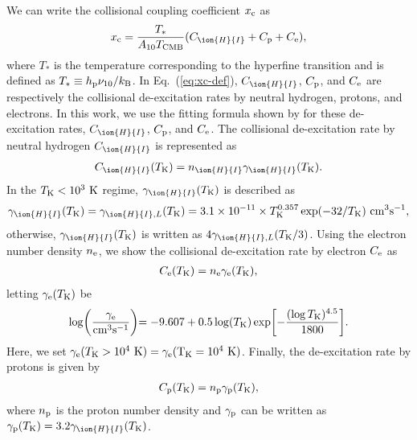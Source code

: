 \documentclass[a4paper,fleqn,usenatbib,useAMS]{mnras}
\begin{document}
We can write the collisional coupling coefficient $x_{\rm c}$ as
\begin{align}
	x_{\rm c}=\frac{T_{\ast}}{A_{10}T_{\rm{CMB}}}(C_{\ion{H}{I}}+C_{\rm{p}}+C_{\rm{e}}),
\label{eq:xc-def}
\end{align}
where $T_{\ast}$ is the temperature corresponding to the hyperfine transition and is defined as 
$T_{\ast}\equiv h_{\rm{p}} \nu_{10}/k_{\rm{B}}$. 
In Eq.~(\ref{eq:xc-def}),
$C_{\ion{H}{I}}$, $C_{\rm{p}}$, and $C_{\rm{e}}$ are respectively the collisional de-excitation rates by neutral hydrogen, protons, and electrons. 
In this work, we use the fitting formula shown by \citet{Kuhlen2006}
for these de-excitation rates, $C_{\ion{H}{I}}$, $C_{\rm{p}}$, and
$C_{\rm{e}}$.
The collisional de-excitation rate by neutral hydrogen $C_{\ion{H}{I}}$ is represented as 
\begin{align}
	C_{\ion{H}{I}}(T_{\rm{K}})=n_{\ion{H}{I}}\gamma_{\ion{H}{I}}(T_{\rm{K}}). \label{CH}
\end{align}
In the $T_{\rm{K}}<10^{3}~\rm{K}$ regime, $\gamma_{\ion{H}{I}}(T_{\rm K})$ is described as 
\begin{align}
	\gamma_{\ion{H}{I}}(T_{\rm{K}})=\gamma_{\ion{H}{I}, L}(T_{\rm{K}})=3.1\times10^{-11}\times T_{\rm{K}}^{0.357}\exp(-32/T_{\rm{K}})~
	\rm{cm}^{3}\rm{s}^{-1} , \label{gamma}
\end{align}
otherwise, $\gamma_{\ion{H}{I}}(T_{\rm{K}})$ is written as $4\gamma_{\ion{H}{I}, L}(T_{\rm{K}} /3)$. 
Using the electron number density $n_{\rm e}$, we show the collisional de-excitation rate by electron $C_{\rm{e}}$ as 
\begin{align}
	C_{\rm{e}}(T_{\rm{K}})=n_{\rm{e}}\gamma_{\rm{e}}(T_{\rm{K}}),  \label{Ce}
\end{align}
letting $\gamma_{\rm e}(T_{\rm K})$ be 
\begin{align}
	\log \biggl(\frac{\gamma_{\rm{e}}}{\rm{cm^{3}s^{-1}}}\biggl)=-9.607+0.5\log(T_{\rm{K}})\exp\biggl[-\frac{(\log T_{\rm{K}})^{4.5}}{1800}\biggl]. \nonumber
\end{align}
Here, we set $\gamma_{\rm{e}}(T_{\rm{K}}>10^{4}~\rm{K})=\gamma_{\rm{e}}(T_{\rm{K}}=10^{4}~\rm{K})$. 
Finally, the de-excitation rate by protons is given by 
\begin{align}
	C_{\rm{p}}(T_{\rm{K}})=n_{\rm{p}}\gamma_{\rm{p}}(T_{\rm{K}}), \label{Cp}
\end{align}
where $n_{\rm{p}}$ is the proton number density and $\gamma_{\rm{p}}$ can be written as $\gamma_{\rm{p}}(T_{\rm{K}})=3.2\gamma_{\ion{H}{I}} (T_{\rm{K}})$. 
\end{document}

